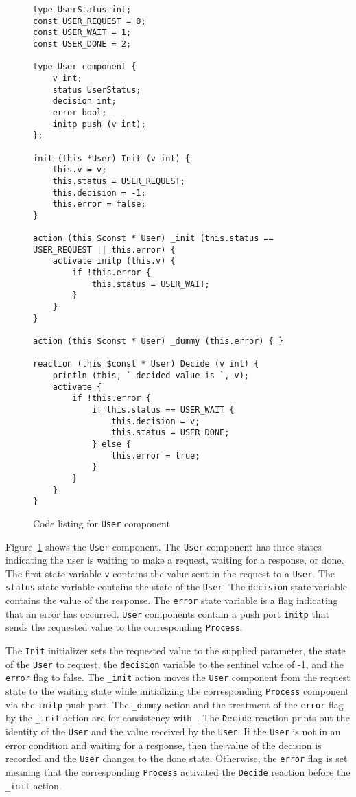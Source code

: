 \begin{figure}
\begingroup
\fontsize{9pt}{11pt}\selectfont
\begin{verbatim}
type UserStatus int;
const USER_REQUEST = 0;
const USER_WAIT = 1;
const USER_DONE = 2;

type User component {
    v int;
    status UserStatus;
    decision int;
    error bool;
    initp push (v int);
};

init (this *User) Init (v int) {
    this.v = v;
    this.status = USER_REQUEST;
    this.decision = -1;
    this.error = false;
}

action (this $const * User) _init (this.status == USER_REQUEST || this.error) {
    activate initp (this.v) {
        if !this.error {
            this.status = USER_WAIT;
        }
    }
}

action (this $const * User) _dummy (this.error) { }

reaction (this $const * User) Decide (v int) {
    println (this, ` decided value is `, v);
    activate {
        if !this.error {
            if this.status == USER_WAIT {
                this.decision = v;
                this.status = USER_DONE;
            } else {
                this.error = true;
            }
        }
    }
}
\end{verbatim}
\endgroup
\cprotect\caption{Code listing for \verb+User+ component}
\label{user}
\end{figure}

Figure~\ref{user} shows the \verb+User+ component.
The \verb+User+ component has three states indicating the user is waiting to make a request, waiting for a response, or done.
The first state variable \verb+v+ contains the value sent in the request to a \verb+User+.
The \verb+status+ state variable contains the state of the \verb+User+.
The \verb+decision+ state variable contains the value of the response.
The \verb+error+ state variable is a flag indicating that an error has occurred.
\verb+User+ components contain a push port \verb+initp+ that sends the requested value to the corresponding \verb+Process+.

The \verb+Init+ initializer sets the requested value to the supplied parameter, the state of the \verb+User+ to request, the \verb+decision+ variable to the sentinel value of -1, and the \verb+error+ flag to false.
The \verb+_init+ action moves the \verb+User+ component from the request state to the waiting state while initializing the corresponding \verb+Process+ component via the \verb+initp+ push port.
The \verb+_dummy+ action and the treatment of the \verb+error+ flag by the \verb+_init+ action are for consistency with~\cite{nancy1996distributed}.
The \verb+Decide+ reaction prints out the identity of the \verb+User+ and the value received by the \verb+User+.
If the \verb+User+ is not in an error condition and waiting for a response, then the value of the decision is recorded and the \verb+User+ changes to the done state.
Otherwise, the \verb+error+ flag is set meaning that the corresponding \verb+Process+ activated the \verb+Decide+ reaction before the \verb+_init+ action.

